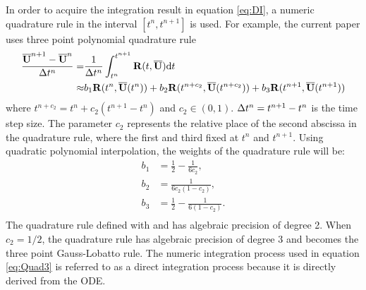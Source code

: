 \documentclass[preprint,12pt]{elsarticle}
\begin{document}
In order to acquire the integration result in equation
\eqref{eq:DI}, a numeric quadrature rule in the interval
$[t^n, t^{n+1}]$ is used. For example, the current paper
uses three point polynomial quadrature rule
\begin{equation}
    \label{eq:Quad3}
    \begin{aligned}
        \frac{\overline{\mathbf{U}}^{n+1} - \overline{\mathbf{U}}^{n}}{\mathrm\Delta t^n} = & \frac{1}{\mathrm\Delta t^n}
        \int_{t^n}^{t^{n+1}}{
        \mathbf{R}(t, \overline{\mathbf{U}}) \dd t
        }                                                           \\ \approx &
        b_1\mathbf{R}(t^n, \overline{\mathbf{U}}(t^n))
        +
        b_2\mathbf{R}(t^{n+c_2}, \overline{\mathbf{U}}(t^{n+c_2}))
        +
        b_3\mathbf{R}(t^{n+1}, \overline{\mathbf{U}}(t^{n+1}))
    \end{aligned}
\end{equation}
where $t^{n+c_2} = t^{n} + c_2 (t^{n+1} - t^n)$ and $c_2\in(0,1)$.
$\mathrm\Delta t^n=t^{n+1} - t^n$ is
the time step size.
The parameter $c_2$ represents the relative place of the second abscissa
in the quadrature rule, where the first and third fixed at $t^{n}$ and $t^{n + 1}$.
Using quadratic polynomial interpolation,
the weights of the quadrature rule will be:
\begin{equation}
    \begin{aligned}
        b_1 & = \frac{1}{2} - \frac{1}{6{c_2}},     \\
        b_2 & = \frac{1}{6{c_2}(1-{c_2})},          \\
        b_3 & = \frac{1}{2} - \frac{1}{6(1-{c_2})}. \\
    \end{aligned}
    \label{eq:integ0}
\end{equation}
The quadrature rule defined with
 and  has algebraic precision
of degree 2. When $c_2=1/2$, the quadrature rule has algebraic precision of
degree 3 and becomes the three point Gauss-Lobatto rule.
The numeric integration process used in equation \eqref{eq:Quad3}
is referred to as a direct integration process because it is
directly derived from the ODE.


\end{document}
